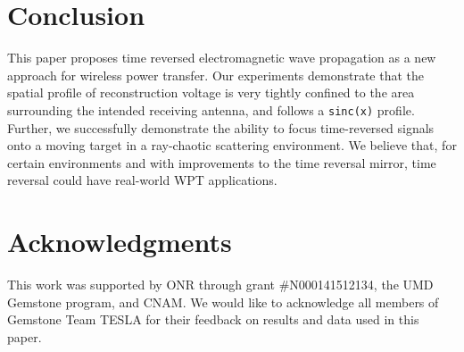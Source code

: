 \documentclass[conference]{IEEEtran}
\begin{document}
\section{Conclusion}


This paper proposes time reversed electromagnetic wave propagation as a new
approach for wireless power transfer.
%
Our experiments demonstrate that the spatial profile of reconstruction voltage
is very tightly confined to the area surrounding the intended receiving antenna,
and follows a \texttt{sinc(x)} profile.
%
Further, we successfully demonstrate the ability to focus time-reversed signals
onto a moving target in a ray-chaotic scattering environment.
%
We believe that, for certain environments and with improvements to the time
reversal mirror, time reversal could have real-world WPT applications.


\section*{Acknowledgments}
This work was supported by ONR through grant \#N000141512134, the UMD Gemstone
program, and CNAM. 
%
We would like to acknowledge all members of Gemstone Team TESLA for their
feedback on results and data used in this paper.




\end{document}
